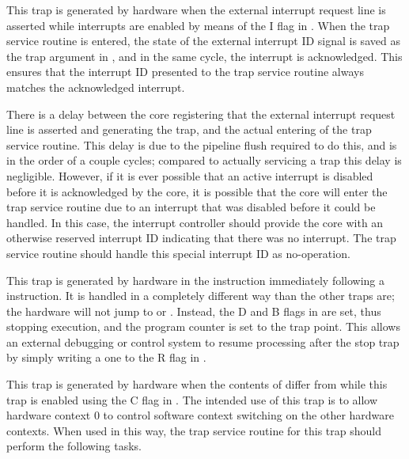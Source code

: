 This trap is generated by hardware when the external interrupt request line is
asserted while interrupts are enabled by means of the I flag in . When
the trap service routine is entered, the state of the external interrupt ID
signal is saved as the trap argument in , and in the same cycle, the
interrupt is acknowledged. This ensures that the interrupt ID presented to the
trap service routine always matches the acknowledged interrupt.

There is a delay between the core registering that the external interrupt
request line is asserted and generating the trap, and the actual entering of the
trap service routine. This delay is due to the pipeline flush required to do
this, and is in the order of a couple cycles; compared to actually servicing a
trap this delay is negligible. However, if it is ever possible that an active
interrupt is disabled before it is acknowledged by the core, it is possible that
the core will enter the trap service routine due to an interrupt that was
disabled before it could be handled. In this case, the interrupt controller
should provide the core with an otherwise reserved interrupt ID indicating that
there was no interrupt. The trap service routine should handle this special
interrupt ID as no-operation.



This trap is generated by hardware in the instruction immediately following a
 instruction. It is handled in a completely different way than the
other traps are; the hardware will not jump to  or . Instead,
the D and B flags in  are set, thus stopping execution, and the
program counter is set to the trap point. This allows an external debugging or
control system to resume processing after the stop trap by simply writing
a one to the R flag in .



This trap is generated by hardware when the contents of  differ from
 while this trap is enabled using the C flag in . The
intended use of this trap is to allow hardware context 0 to control software
context switching on the other hardware contexts. When used in this way, the
trap service routine for this trap should perform the following tasks.

